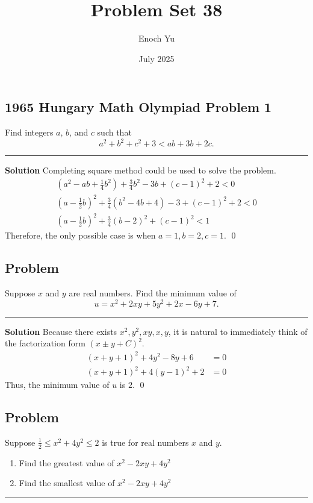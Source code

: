 \documentclass{article}
\title{Problem Set 38}
\author{Enoch Yu}
\date{July 2025}
\newenvironment{solution}{\begin{trivlist}\item[]{\bf Solution}}{\qed \end{trivlist}}
\newcommand {\MyLine} {\noindent\rule{\textwidth}{0.4pt}}
\begin{document}
\subsection*{1965 Hungary Math Olympiad Problem 1}
{\color {Gray}
Find integers $a$, $b$, and $c$ such that
\[
a^2 + b^2 + c^2 + 3 < ab + 3b + 2c.
\]
}
\MyLine

\begin{solution}
Completing square method could be used to solve the problem.
\begin{align*}
    \left( a^2 - ab + \frac{1}{4} b^2 \right) + \frac{3}{4} b^2 - 3b + (c - 1)^2 + 2 < 0 \\
    \left( a - \frac{1}{2} b \right)^2 + \frac{3}{4} \left( b^2 - 4b + 4 \right) - 3 + (c - 1)^2 + 2 < 0 \\
    \left( a - \frac{1}{2} b \right)^2 + \frac{3}{4} (b - 2)^2 + (c - 1)^2 < 1
\end{align*}
Therefore, the only possible case is when $\boxed{a = 1, b = 2, c=1}$.
\end{solution}

\subsection*{Problem}
{\color {Gray}
Suppose $x$ and $y$ are real numbers. Find the minimum value of
\[
u = x^2 + 2xy + 5y^2 + 2x - 6y + 7.
\]
}
\MyLine

\begin{solution}
Because there exists $x^2, y^2, xy, x, y$, it is natural to immediately think of the factorization form $(x \pm y + C)^2$.
\begin{align*}
    (x + y + 1)^2 + 4y^2 - 8y + 6 &= 0 \\
    (x + y + 1)^2 + 4(y - 1)^2 + 2 &= 0
\end{align*}
Thus, the minimum value of $u$ is $\boxed{2}$.
\end{solution}

\newpage
\subsection*{Problem}
{\color {Gray}
Suppose $\frac{1}{2} \leq x^2 + 4y^2 \leq 2$ is true for real numbers $x$ and $y$.
\begin{enumerate}
    \item Find the greatest value of $x^2 - 2xy + 4y^2$
    \item Find the smallest value of $x^2 - 2xy + 4y^2$
\end{enumerate}
}
\MyLine
\end{document}
